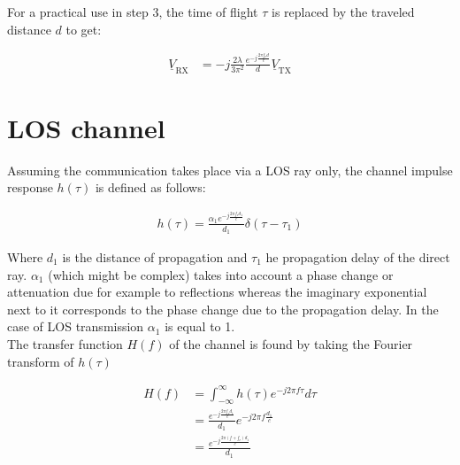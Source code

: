 \documentclass[10pt,a4paper]{ULBreport}
\begin{document}
For a practical use in step 3, the time of flight $\tau$ is replaced by the traveled distance $d$ to get:

\begin{align}
    \underline{V}_{\text{RX}} &= -j\frac{2 \lambda }{3\pi^2}\frac{e^{-j\frac{2\pi f_c d}{c}}}{d}\underline{V}_{\text{TX}}
    \label{eq:voltage_RX}
\end{align}

\section{LOS channel}
\label{sec:LOS_channel}

Assuming the communication takes place via a LOS ray only, the channel impulse response $h(\tau)$ is defined as follows:

\begin{align*}
    h(\tau) = \frac{\alpha_1 e^{-j\frac{2\pi f_cd_1}{c}}}{d_1} \delta\left(\tau - \tau_1\right)
\end{align*}

Where $d_1$ is the distance of propagation and $\tau_1$ he propagation delay of the direct ray. $\alpha_1$ (which might be complex) takes into account a phase change or attenuation due for example to reflections whereas the imaginary exponential next to it corresponds to the phase change due to the propagation delay. In the case of LOS transmission $\alpha_1$ is equal to 1.\\
The transfer function $H(f)$ of the channel is found by taking the Fourier transform of $h(\tau)$

\begin{align*}
    H(f) &= \int_{-\infty}^{\infty} h(\tau) e^{-j2\pi f \tau} d\tau\\
    &= \frac{e^{-j\frac{2\pi f_c d_1}{c}}}{d_1}e^{-j2\pi f \frac{d_1}{c}}\\
    &= \frac{e^{-j \frac{2\pi (f+f_c)d_1}{c}}}{d_1}\\
\end{align*}


\end{document}
